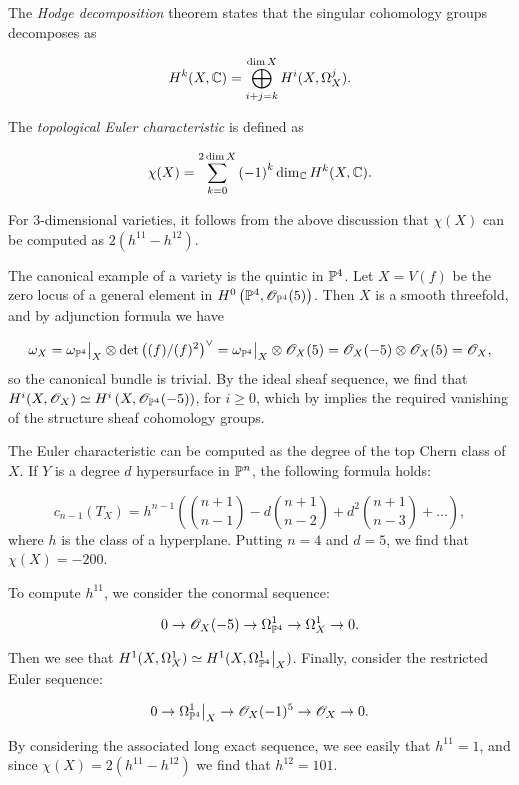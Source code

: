 The \emph{Hodge decomposition} theorem \cite[page 142]{voison_cg} states that the singular cohomology groups decomposes as

$$
H^k(X,\C) = \bigoplus_{i+j=k}^{\dim X} H^i(X,\Omega_X^j).
$$

The \emph{topological Euler characteristic} is defined as

$$
\chi(X) = \sum_{k=0}^{2 \dim X}\left(-1\right)^k \dim_\C H^k(X, \C).
$$

For 3-dimensional \CY varieties, it follows from the above discussion that $\chi(X)$ can be computed as $2(h^{11} - h^{12})$. 

\begin{example}
The canonical example of a \CY variety is the quintic in $\P^4$. Let $X=V(f)$ be the zero locus of a general element in $H^0\left(\P^4,\OO_{\P^4}(5)\right)$. Then $X$ is a smooth threefold, and by adjunction formula we have 

\[
\omega_X = \restr{\omega_{\P^4}}{X} \otimes \det {\left( (f)/(f)^2 \right)}^\vee = \restr{\omega_{\P^4}}{X} \otimes \OO_X(5)=\OO_X(-5) \otimes \OO_X(5) = \OO_X,
\]
so the canonical bundle is trivial. By the ideal sheaf sequence, we find that $H^i(X,\OO_X) \simeq H^i\left(X,\OO_{\P^4}(-5)\right)$, for $i \geq 0$, which by \cite[Theorem 5.1, Chapter III]{hartshorne} implies the required vanishing of the structure sheaf cohomology groups.

The Euler characteristic can be computed as the degree of the top Chern class of $X$. If $Y$ is a degree $d$ hypersurface in $\P^n$, the following formula holds:

$$
c_{n-1}(T_X) = h^{n-1} \left( \binom{n+1}{n-1} - d \binom{n+1}{n-2} + d^2 \binom{n+1}{n-3} + \ldots\right),
$$
where $h$ is the class of a hyperplane. Putting $n=4$ and $d=5$, we find that $\chi(X)=-200$.

To compute $h^{11}$, we consider the conormal sequence:

\[
0 \to \OO_X(-5) \to \Omega_{\P^4}^1 \to \Omega_X^1 \to 0.
\]

Then we see that $H^1(X,\Omega_X^1) \simeq H^1(X,\restr{\Omega_{\P^4}^1}{X})$. Finally, consider the restricted Euler sequence:

\[
0 \to \restr{\Omega_{\P^4}^1}{X} \to \OO_X(-1)^5  \to \OO_X \to 0.
\]

By considering the associated long exact sequence, we see easily that $h^{11}=1$, and since $\chi(X)=2(h^{11}-h^{12})$ we find that $h^{12}=101$.
\end{example}

